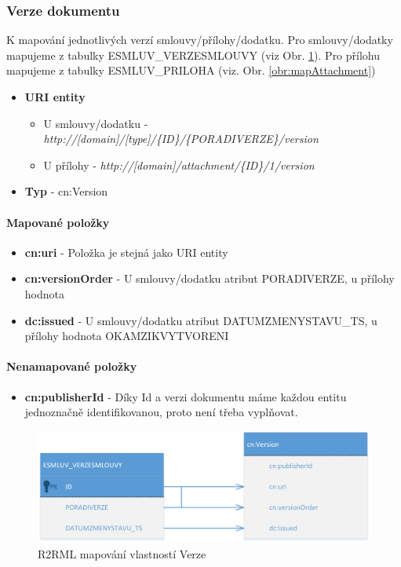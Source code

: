 \subsubsection{Verze dokumentu}

K mapování jednotlivých verzí smlouvy/přílohy/dodatku. Pro smlouvy/dodatky mapujeme z tabulky ESMLUV\_VERZESMLOUVY (viz Obr. \ref{obr:mapVersion}). Pro přílohu mapujeme z tabulky ESMLUV\_PRILOHA (viz. Obr. \ref{obr:mapAttachment})

\begin{itemize}
\item \textbf{URI entity}
	\begin{itemize}
	\item U smlouvy/dodatku - \textit{http://[domain]/[type]/\{ID\}/\{PORADIVERZE\}/version}
	\item U přílohy - \textit{http://[domain]/attachment/\{ID\}/1/version}
	\end{itemize}
\item \textbf{Typ} - cn:Version
\end{itemize}

\paragraph*{Mapované položky}
\begin{itemize}
\item \textbf{cn:uri} - Položka je stejná jako URI entity
\item \textbf{cn:versionOrder} - U smlouvy/dodatku atribut PORADIVERZE, u přílohy hodnota 
\item \textbf{dc:issued} - U smlouvy/dodatku atribut DATUMZMENYSTAVU\_TS, u přílohy hodnota OKAMZIKVYTVORENI
\end{itemize}

\paragraph*{Nenamapované položky}
\begin{itemize}
\item \textbf{cn:publisherId} - Díky Id a verzi dokumentu máme každou entitu jednoznačně identifikovanou, proto není třeba vyplňovat.
\end{itemize}

\begin{figure}[H]
\centerline{\includegraphics[width=\textwidth]{img/mapVersion.eps}}
\caption{R2RML mapování vlastností Verze}
\label{obr:mapVersion}
\end{figure}

